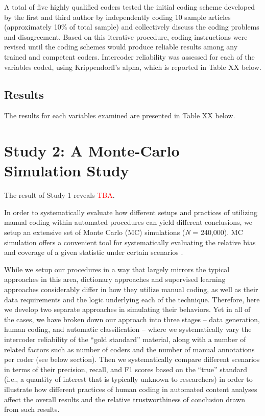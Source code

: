 \documentclass[man, 12pt, a4paper, nolmodern, noextraspace]{apa6}
\begin{document}
    A total of five highly qualified coders tested the initial coding scheme developed by the first and third author by independently coding 10 sample articles (approximately 10\% of total sample) and collectively discuss the coding problems and disagreement. Based on this iterative procedure, coding instructions were revised until the coding schemes would produce reliable results among any trained and competent coders. Intercoder reliability was assessed for each of the variables coded, using Krippendorff’s alpha, which is reported in Table XX below.   
    
\subsection{Results}

    The results for each variables examined are presented in Table XX below. 

\section{Study 2: A Monte-Carlo Simulation Study}
    
    The result of Study 1 reveals \textcolor{red}{TBA}. 
    
    In order to systematically evaluate how different setups and practices of utilizing manual coding within automated procedures can yield different conclusions, we setup an extensive set of Monte Carlo (MC) simulations (\textit{N} = 240,000). MC simulation offers a convenient tool for systematically evaluating the relative bias and coverage of a given statistic under certain scenarios \parencites[for an example, see][]{scharkow2017measurement, leemann2017extending, stephenson2003monte}. 
    
    While we setup our procedures in a way that largely mirrors the typical approaches in this area, dictionary approaches and supervised learning approaches considerably differ in how they utilize manual coding, as well as their data requirements and the logic underlying each of the technique. Therefore, here we develop two separate approaches in simulating their behaviors. Yet in all of the cases, we have broken down our approach into three stages – data generation, human coding, and automatic classification – where we systematically vary the intercoder reliability of the “gold standard” material, along with a number of related factors such as number of coders and the number of manual annotations per coder (see below section). Then we systematically compare different scenarios in terms of their precision, recall, and F1 scores based on the \enquote{true} standard (i.e., a quantity of interest that is typically unknown to researchers) in order to illustrate how different practices of human coding in automated content analyses affect the overall results and the relative trustworthiness of conclusion drawn from such results.
    
\end{document}
